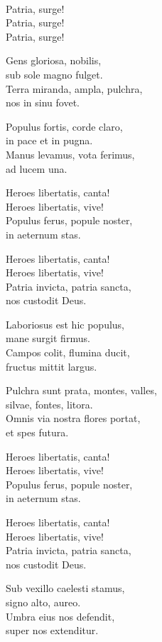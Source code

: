 \begin{lyrics}
\\
Patria, surge!\\
Patria, surge!\\
Patria, surge!

Gens gloriosa, nobilis,\\
sub sole magno fulget.\\
Terra miranda, ampla, pulchra,\\
nos in sinu fovet.

Populus fortis, corde claro,\\
in pace et in pugna.\\
Manus levamus, vota ferimus,\\
ad lucem una.

Heroes libertatis, canta!\\
Heroes libertatis, vive!\\
Populus ferus, popule noster,\\
in aeternum stas.

Heroes libertatis, canta!\\
Heroes libertatis, vive!\\
Patria invicta, patria sancta,\\
nos custodit Deus.

Laboriosus est hic populus,\\
mane surgit firmus.\\
Campos colit, flumina ducit,\\
fructus mittit largus.

Pulchra sunt prata, montes, valles,\\
silvae, fontes, litora.\\
Omnis via nostra flores portat,\\
et spes futura.

Heroes libertatis, canta!\\
Heroes libertatis, vive!\\
Populus ferus, popule noster,\\
in aeternum stas.

Heroes libertatis, canta!\\
Heroes libertatis, vive!\\
Patria invicta, patria sancta,\\
nos custodit Deus.

Sub vexillo caelesti stamus,\\
signo alto, aureo.\\
Umbra eius nos defendit,\\
super nos extenditur.


\end{lyrics}
